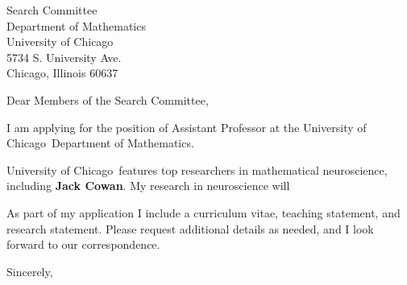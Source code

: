\documentclass[11pt,a4paper]{letter}
\begin{document}

\def\School{University of Chicago}

\begin{letter}
{Search Committee\\
Department of Mathematics\\
University of Chicago\\
5734 S. University Ave.\\
Chicago, Illinois 60637}


\opening{Dear Members of the Search Committee,}

I am applying for the position of Assistant Professor at the \School~Department of Mathematics. 



\School~features top researchers in mathematical neuroscience, including \textbf{Jack Cowan}. My research in neuroscience will 



As part of my application I include a curriculum vitae, teaching statement, and research statement. Please request additional details as needed, and I look forward to our correspondence.

\closing{Sincerely,}
\end{letter}
\end{document}
